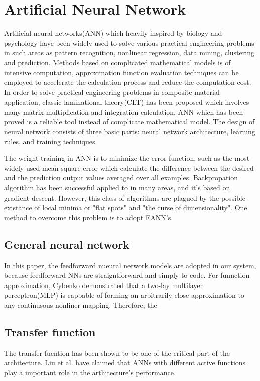\section{Artificial Neural Network}
Artificial neural networks(ANN) which heavily inspired by biology and psychology
have been widely used to solve various practical engineering problems in such
areas as pattern recognition, nonlinear regression, data mining, clustering and
prediction. Methods based on complicated mathematical models is of intensive
computation, approximation function evaluation techniques can be employed to
accelerate the calculation process and reduce the computation cost. In order to
solve practical engineering problems in composite material application, classic
laminational theory(CLT) has been proposed which involves many matrix
multiplication and integration calculation. ANN which has been proved is a
reliable tool instead of complicate mathematical model.  The design of neural
network consists of three basic parts: neural network architecture, learning
rules, and training techniques.

The weight training in ANN is to minimize the error function, such as the most
widely used mean square error which calculate the difference  between the
desired and the prediction output values averaged over all examples.
Backpropation algorithm has been successful applied to in many areas, and it's
based on gradient descent. However, this class of algorithms are  plagued by
the possible existance of local minima or "flat spots" and "the curse of
dimensionality". One method to overcome this problem is to adopt EANN's.

\subsection{General neural network}

In this paper, the feedforward nueural network models are adopted in our
system, because feedforward NNs are straigntforward and simply to code.  For
funnction approximation, Cybenko demonstrated that a two-lay multilayer
perceptron(MLP) is capbable of forming an arbitrarily close approximation to
any continusous nonliner mapping\cite{cybenko1989approximation}. Therefore, the


\subsection{Transfer function}
The transfer fucntion has been shown to be one of the critical part of the
architecture. Liu \cite{liu1996evolutionary} et al. have claimed that ANNs with
different active functions play a important role in the arthitecture's performance.











